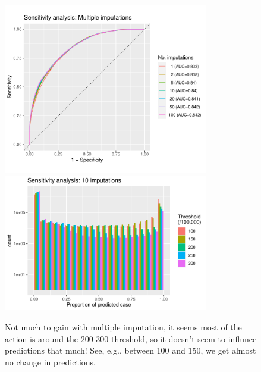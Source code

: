 \documentclass[12pt]{article}
\begin{document}
\clearpage
\begin{figure}[h]
\centering
\includegraphics[width=0.8\textwidth]{figures/roc_n_imputations.pdf}
\includegraphics[width=0.8\textwidth]{figures/prediction_switch_21x10.pdf}
\caption{Not much to gain with multiple imputation, it seems most of the
action is around the 200-300 threshold, so it doesn't seem to influnce
predictions that much! See, e.g., between 100 and 150, we get almost no change
in predictions.}
\end{figure}

\clearpage
\end{document}
